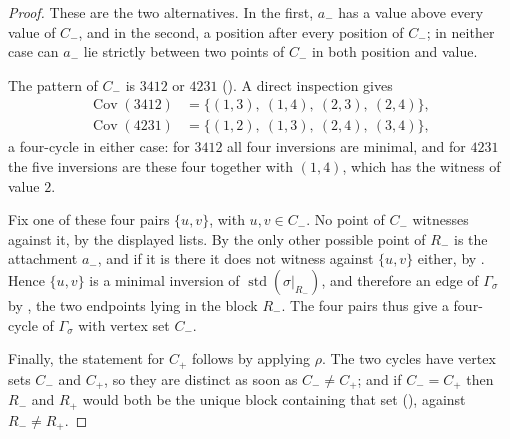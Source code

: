 \documentclass[12pt]{article}
\theoremstyle{definition}
\newcommand{\wo}{w_0}                 %
\newcommand{\rc}{\rho}                %
\newcommand{\std}{\operatorname{std}}
\newcommand{\Cov}{\operatorname{Cov}}  %
\newcommand{\Cm}{C_{-}}
\newcommand{\Cp}{C_{+}}
\newcommand{\Rm}{R_{-}}
\newcommand{\Rp}{R_{+}}
\newcommand{\cgr}{\Gamma}                 %
\begin{document}
\begin{proof}
These are the two alternatives. In the first, $a_-$ has a value above
every value of $\Cm$, and in the second, a position after every position
of $\Cm$; in neither case can $a_-$ lie strictly between two points of
$\Cm$ in both position and value.

 The pattern of $\Cm$ is $3412$ or $4231$
(). A direct
inspection gives
\begin{align*}
   \Cov(3412) &= \bigl\{(1,3),\ (1,4),\ (2,3),\ (2,4)\bigr\} ,\\
   \Cov(4231) &= \bigl\{(1,2),\ (1,3),\ (2,4),\ (3,4)\bigr\} ,
\end{align*}
a four-cycle in either case: for $3412$ all four inversions are minimal,
and for $4231$ the five inversions are these four together with $(1,4)$,
which has the witness of value $2$.

Fix one of these four pairs $\{u,v\}$, with $u,v \in \Cm$. No point of
$\Cm$ witnesses against it, by the displayed lists. By
 the only other possible point of
$\Rm$ is the attachment $a_-$, and if it is there it does not witness
against $\{u,v\}$ either, by . Hence $\{u,v\}$ is a
minimal inversion of $\std(\sigma|_{\Rm})$, and therefore an edge of
$\cgr_\sigma$ by , the two endpoints lying in the block
$\Rm$. The four pairs thus give a four-cycle of $\cgr_\sigma$ with vertex set $\Cm$.

Finally, the statement for $\Cp$ follows by applying $\rc$. The two
cycles have vertex sets $\Cm$ and $\Cp$, so they are distinct as soon as
$\Cm \ne \Cp$; and if $\Cm = \Cp$ then $\Rm$ and $\Rp$ would both be the
unique block containing that set (), against $\Rm \ne \Rp$.
\end{proof}
\end{document}
